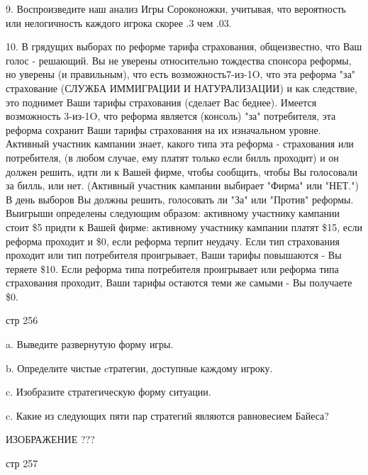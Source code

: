 \documentclass[a4paper,12pt]{article}
\begin{document}
9. Воспроизведите наш анализ Игры Сороконожки,
учитывая, что вероятность или нелогичность каждого
игрока скорее .3 чем .03.

10. В грядущих выборах по реформе тарифа
страхования, общеизвестно, что Ваш голос -
решающий. Вы не уверены относительно тождества
спонсора реформы, но уверены (и правильным), что
есть возможность7-из-1O, что эта реформа "за"
страхование (СЛУЖБА ИММИГРАЦИИ И НАТУРАЛИЗАЦИИ) и
как следствие, это поднимет Ваши тарифы страхования
(сделает Вас беднее). Имеется возможность 3-из-1O,
что реформа является (консоль) "за" потребителя,
эта реформа сохранит Ваши тарифы страхования на их
изначальном уровне. Активный участник кампании
знает, какого типа эта реформа - страхования или
потребителя, (в любом случае, ему платят только
если билль проходит) и он должен решить, идти ли к
Вашей фирме, чтобы сообщить, чтобы Вы голосовали за
билль, или нет. (Активный участник кампании
выбирает "Фирма" или "НЕТ.") В день выборов Вы
должны решить, голосовать ли "За" или "Против"
реформы. Выигрыши определены следующим образом:
активному участнику кампании стоит \$5 придти к
Вашей фирме: активному участнику кампании платят
\$15, если реформа проходит и \$0, если реформа
терпит неудачу. Если тип страхования проходит или
тип потребителя проигрывает, Ваши тарифы повышаются
- Вы теряете \$10. Если реформа типа потребителя
проигрывает или реформа типа страхования проходит,
Ваши тарифы остаются теми же самыми - Вы получаете
\$0.

стр 256

a. Выведите развернутую форму игры.

b. Определите чистые cтратегии, доступные каждому
игроку.

c. Изобразите стратегическую форму ситуации.

c. Какие из следующих пяти пар стратегий являются
равновесием Байеса?

ИЗОБРАЖЕНИЕ ???

стр 257
\end{document}
